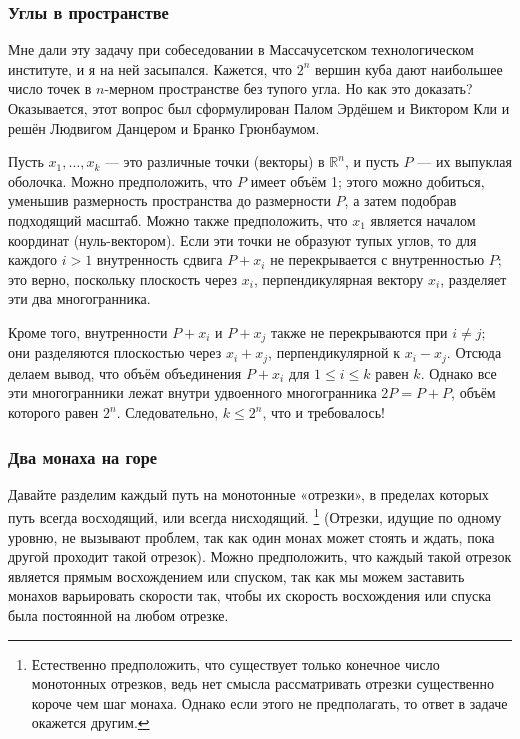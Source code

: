 \subsubsection*{Углы в пространстве}

Мне дали эту задачу при собеседовании в Массачусетском технологическом институте, и я на ней засыпался.
Кажется, что $2^n$ вершин куба дают наибольшее число точек в $n$-мерном пространстве без тупого угла.
Но как это доказать?
Оказывается, этот вопрос был сформулирован Палом Эрдёшем и Виктором Кли и решён Людвигом Данцером и Бранко Грюнбаумом. %

\medskip

Пусть $x_1,\dots,x_k$ --- это различные точки (векторы) в $\mathbb{R}^n$, и пусть $P$ --- их выпуклая оболочка.
Можно предположить, что $P$ имеет объём 1;
этого можно добиться, уменьшив размерность пространства до размерности $P$, а затем подобрав подходящий масштаб.
Можно также предположить, что $x_1$ является началом координат (нуль-вектором).
Если эти точки не образуют тупых углов, то для каждого $i>1$ внутренность сдвига $P+x_i$ не перекрывается с внутренностью $P$;
это верно, поскольку плоскость через $x_i$, перпендикулярная вектору $x_i$, разделяет эти два многогранника.

Кроме того, внутренности $P+x_i$ и $P+x_j$ также не перекрываются при $i\ne j$;
они разделяются плоскостью через $x_i+x_j$, перпендикулярной к $x_i-x_j$.
Отсюда делаем вывод, что объём объединения $P+x_i$ для $1 \le i \le k$ равен $k$.
Однако все эти многогранники лежат внутри удвоенного многогранника $2P = P+P$, объём которого равен $2^n$. Следовательно, $k \le 2^n$, что и требовалось!
\heart

\subsubsection*{Два монаха на горе}

Давайте разделим каждый путь на монотонные «отрезки», в пределах которых путь всегда восходящий, или всегда нисходящий.%
\footnote{Естественно предположить, что существует только конечное число монотонных отрезков, ведь нет смысла рассматривать отрезки существенно короче чем шаг монаха.
Однако если этого не предполагать, то ответ в задаче окажется другим.
}
(Отрезки, идущие по одному уровню, не вызывают проблем, так как один монах может стоять и ждать, пока другой проходит такой отрезок).
Можно предположить, что каждый такой отрезок является прямым восхождением или спуском, так как мы можем заставить монахов варьировать скорости так, чтобы их скорость восхождения или спуска была постоянной на любом отрезке.

